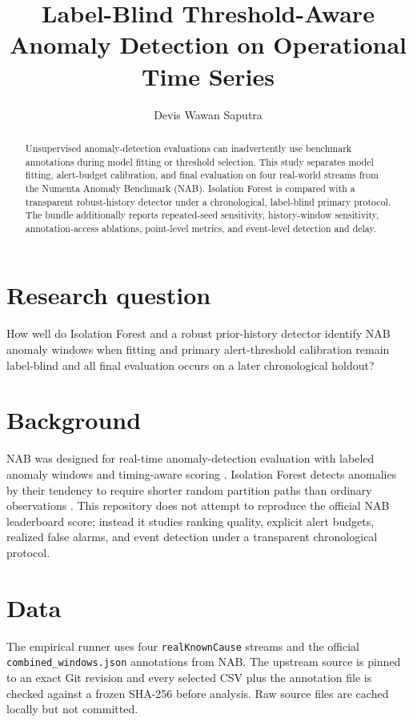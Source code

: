 \documentclass[11pt]{article}
\title{Label-Blind Threshold-Aware Anomaly Detection on Operational Time Series}
\author{Devis Wawan Saputra}
\date{}
\begin{document}
\maketitle

\begin{abstract}
Unsupervised anomaly-detection evaluations can inadvertently use benchmark annotations during model fitting or threshold selection. This study separates model fitting, alert-budget calibration, and final evaluation on four real-world streams from the Numenta Anomaly Benchmark (NAB). Isolation Forest is compared with a transparent robust-history detector under a chronological, label-blind primary protocol. The bundle additionally reports repeated-seed sensitivity, history-window sensitivity, annotation-access ablations, point-level metrics, and event-level detection and delay.
\end{abstract}

\section{Research question}
How well do Isolation Forest and a robust prior-history detector identify NAB anomaly windows when fitting and primary alert-threshold calibration remain label-blind and all final evaluation occurs on a later chronological holdout?

\section{Background}
NAB was designed for real-time anomaly-detection evaluation with labeled anomaly windows and timing-aware scoring \cite{ahmad2017nab}. Isolation Forest detects anomalies by their tendency to require shorter random partition paths than ordinary observations \cite{liu2008isolation}. This repository does not attempt to reproduce the official NAB leaderboard score; instead it studies ranking quality, explicit alert budgets, realized false alarms, and event detection under a transparent chronological protocol.

\section{Data}
The empirical runner uses four \texttt{realKnownCause} streams and the official \texttt{combined\_windows.json} annotations from NAB. The upstream source is pinned to an exact Git revision and every selected CSV plus the annotation file is checked against a frozen SHA-256 before analysis. Raw source files are cached locally but not committed.
\end{document}
